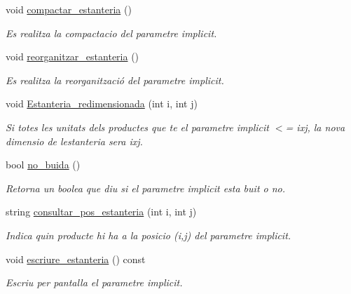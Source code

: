 \begin{DoxyCompactItemize}
void \hyperlink{class_estanteria_aefcf5c93b909a2d61c5805c4e39f56d1}{compactar\+\_\+estanteria} ()
\begin{DoxyCompactList}\small\item\em Es realitza la compactacio del parametre implicit. \end{DoxyCompactList}\item 
void \hyperlink{class_estanteria_a605404d278df85704686201e9ac5bc4b}{reorganitzar\+\_\+estanteria} ()
\begin{DoxyCompactList}\small\item\em Es realitza la reorganització del parametre implicit. \end{DoxyCompactList}\item 
void \hyperlink{class_estanteria_a4a5f0fb1576fc6245bd81249fedb2bb4}{Estanteria\+\_\+redimensionada} (int i, int j)
\begin{DoxyCompactList}\small\item\em Si totes les unitats dels productes que te el parametre implicit $<$= ixj, la nova dimensio de l\textquotesingle{}estanteria sera ixj. \end{DoxyCompactList}\item 
bool \hyperlink{class_estanteria_a28210da5d76be58356c3544871130a2e}{no\+\_\+buida} ()
\begin{DoxyCompactList}\small\item\em Retorna un boolea que diu si el parametre implicit esta buit o no. \end{DoxyCompactList}\item 
string \hyperlink{class_estanteria_ad0b776e636062653f986010880610ced}{consultar\+\_\+pos\+\_\+estanteria} (int i, int j)
\begin{DoxyCompactList}\small\item\em Indica quin producte hi ha a la posicio (i,j) del parametre implicit. \end{DoxyCompactList}\item 
void \hyperlink{class_estanteria_ac00f0367653416ca3bd588939a7c9c22}{escriure\+\_\+estanteria} () const 
\begin{DoxyCompactList}\small\item\em Escriu per pantalla el parametre implicit. \end{DoxyCompactList}\end{DoxyCompactItemize}
